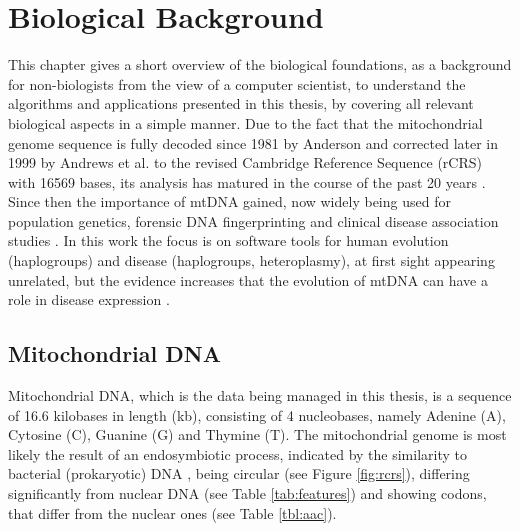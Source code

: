 \chapter{Biological Background} 
\label{chap:BioFound}
This chapter gives a short overview of the biological foundations, as a background for non-biologists from the view of a computer scientist, to understand the algorithms and applications presented in this thesis, by covering all relevant biological aspects in a simple manner. Due to the fact that the mitochondrial genome sequence is fully decoded since 1981 by Anderson \cite{Anderson1981} and corrected later in 1999 by Andrews et al. \cite{Andrews1999} to the revised Cambridge Reference Sequence (rCRS) with 16569 bases, its analysis has matured in the course of the past 20 years \cite{BandeltHansJurgenRichardsMartinMacaulay2006}. Since then the importance of mtDNA gained, now widely being used for population genetics, forensic DNA fingerprinting and clinical disease association studies \cite{Weissensteiner2010}. In this work the focus is on software tools for human evolution (haplogroups) and disease (haplogroups, heteroplasmy), at first sight appearing unrelated, but the evidence increases that the evolution of mtDNA can have a role in disease expression \cite{BandeltHansJurgenRichardsMartinMacaulay2006}. 

\section{Mitochondrial DNA}
Mitochondrial DNA, which is the data being managed in this thesis, is a sequence of 16.6 kilobases in length (kb), consisting of 4 nucleobases, namely Adenine (A), Cytosine (C), Guanine (G) and Thymine (T). The mitochondrial genome is most likely the result of an endosymbiotic process, indicated by the similarity to bacterial (prokaryotic) DNA \cite{Pittis2016}, being circular (see Figure \ref{fig:rcrs}), differing significantly from nuclear DNA (see Table \ref{tab:features}) and showing codons, that differ from the nuclear ones (see Table \ref{tbl:aac}). 

